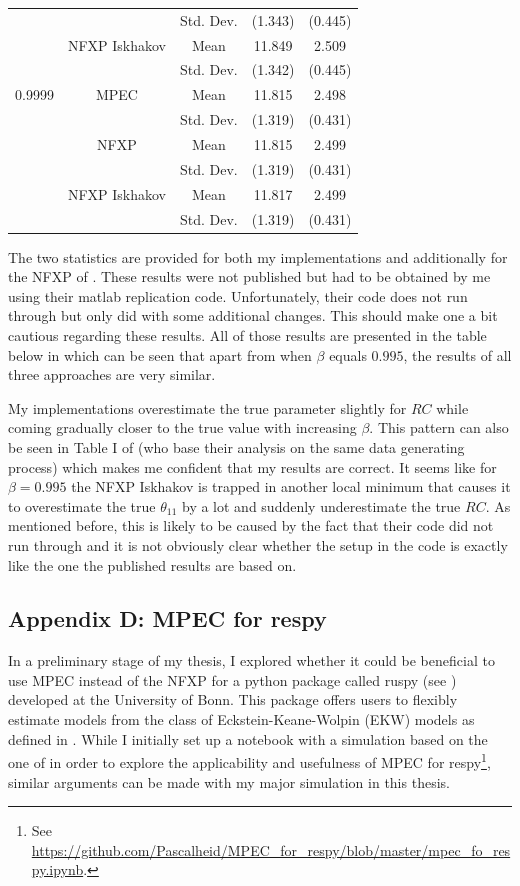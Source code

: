 \begin{table}[!t]
\begin{tabular}{l c c c c}
		& & Std. Dev. & (1.343) & (0.445) \\
		& NFXP Iskhakov & Mean & 11.849 & 2.509 \\
		& & Std. Dev. & (1.342) & (0.445) \\ \midrule
		0.9999 & MPEC & Mean & 11.815 & 2.498 \\
		& & Std. Dev. & (1.319) & (0.431) \\
		& NFXP & Mean & 11.815 & 2.499 \\
		& & Std. Dev. & (1.319) & (0.431) \\
		& NFXP Iskhakov & Mean & 11.817	& 2.499 \\
		& & Std. Dev. & (1.319) & (0.431) \\ \bottomrule
	\end{tabular}
\end{table}

The two statistics are provided for both my implementations and additionally for the NFXP of \cite{Iskhakov.2016}. These results were not published but had to be obtained by me using their matlab replication code. Unfortunately, their code does not run through but only did with some additional changes. This should make one a bit cautious regarding these results. All of those results are presented in the table below in which can be seen that apart from when $\beta$ equals $0.995$, the results of all three approaches are very similar.

My implementations overestimate the true parameter slightly for $RC$ while coming gradually closer to the true value with increasing $\beta$. This pattern can also be seen in Table I of \cite{Su.Judd.2012} (who base their analysis on the same data generating process) which makes me confident that my results are correct. It seems like for $\beta = 0.995$ the NFXP Iskhakov is trapped in another local minimum that causes it to overestimate the true $\theta_{11}$ by a lot and suddenly underestimate the true $RC$. As mentioned before, this is likely to be caused by the fact that their code did not run through and it is not obviously clear whether the setup in the code is exactly like the one the published results are based on.

\subsection{Appendix D: MPEC for respy} \label{appendixD}

In a preliminary stage of my thesis, I explored whether it could be beneficial to use MPEC instead of the NFXP for a python package called ruspy (see \cite{Gabler.2020}) developed at the University of Bonn. This package offers users to flexibly estimate models from the class of Eckstein-Keane-Wolpin (EKW) models as defined in \cite{Aguirregabiri.2010}. While I initially set up a notebook with a simulation based on the one of \cite{Iskhakov.2016} in order to explore the applicability and usefulness of MPEC for respy\footnote{ See \url{https://github.com/Pascalheid/MPEC_for_respy/blob/master/mpec_fo_respy.ipynb}.}, similar arguments can be made with my major simulation in this thesis.

